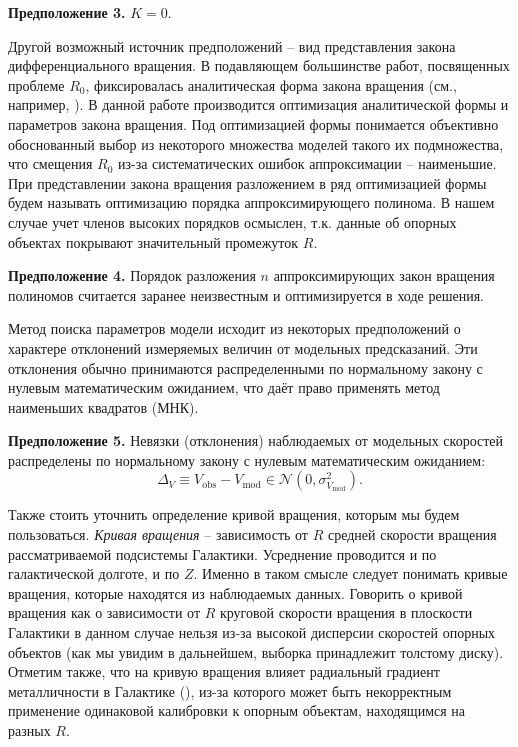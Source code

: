 \documentclass{matmex-diploma-custom}
\begin{document}
\textbf{Предположение 3.}
$K = 0$.

\par Другой возможный источник предположений -- вид представления закона дифференциального вращения. В подавляющем большинстве работ, посвященных проблеме $R_0$, фиксировалась аналитическая форма закона вращения (см., например, \cite{Loktin,Blitz,Gwinn}). В данной работе производится оптимизация аналитической формы и параметров закона вращения. Под оптимизацией формы понимается объективно обоснованный выбор из некоторого множества моделей такого их подмножества, что смещения $R_0$ из-за систематических ошибок аппроксимации -- наименьшие. При представлении закона вращения разложением в ряд оптимизацией формы будем называть оптимизацию порядка аппроксимирующего полинома. В нашем случае учет членов высоких порядков осмыслен, т.к. данные об опорных объектах покрывают значительный промежуток $R$.

\textbf{Предположение 4.}
Порядок разложения $n$ аппроксимирующих закон вращения полиномов считается заранее неизвестным и оптимизируется в ходе решения.

Метод поиска параметров модели исходит из некоторых предположений о характере отклонений измеряемых величин от модельных предсказаний. Эти отклонения обычно принимаются распределенными по нормальному закону с нулевым математическим ожиданием, что даёт право применять метод наименьших квадратов (МНК).

\textbf{Предположение 5.}
Невязки (отклонения) наблюдаемых от модельных скоростей распределены по нормальному закону с нулевым математическим ожиданием: 
\begin{equation}
        \Delta_V \equiv V_{\mathrm{obs}} - V_{\mathrm{mod}} \in \mathcal{N}(0, \sigma^2_{V_{\mathrm{mod}}}).
\end{equation}


Также стоить уточнить определение кривой вращения, которым мы будем пользоваться. \textit{Кривая вращения} -- зависимость от $R$ средней скорости вращения рассматриваемой подсистемы Галактики. Усреднение проводится и по галактической долготе, и по $Z$. Именно в таком смысле следует понимать кривые вращения, которые находятся из наблюдаемых данных. Говорить о кривой вращения как о зависимости от $R$ круговой скорости вращения в плоскости Галактики в данном случае нельзя из-за высокой дисперсии скоростей опорных объектов (как мы увидим в дальнейшем, выборка принадлежит толстому диску). Отметим также, что на кривую вращения влияет радиальный градиент металличности в Галактике (\cite{FishB,FishT}), из-за которого может быть некорректным применение одинаковой калибровки к опорным объектам, находящимся на разных $R$. 
\end{document}
